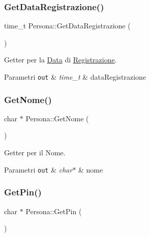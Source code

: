 \subsubsection{\texorpdfstring{Get\+Data\+Registrazione()}{GetDataRegistrazione()}}
{\footnotesize\ttfamily time\+\_\+t Persona\+::\+Get\+Data\+Registrazione (\begin{DoxyParamCaption}{ }\end{DoxyParamCaption})}



Getter per la \mbox{\hyperlink{class_data}{Data}} di \mbox{\hyperlink{class_registrazione}{Registrazione}}. 


\begin{DoxyParams}[1]{Parametri}
\mbox{\tt out}  & {\em time\+\_\+t} & data\+Registrazione \\
\hline
\end{DoxyParams}
\mbox{\label{class_persona_a05788dcb627fed81b04c90a6b82121aa}} 
\subsubsection{\texorpdfstring{Get\+Nome()}{GetNome()}}
{\footnotesize\ttfamily char $\ast$ Persona\+::\+Get\+Nome (\begin{DoxyParamCaption}{ }\end{DoxyParamCaption})}



Getter per il Nome. 


\begin{DoxyParams}[1]{Parametri}
\mbox{\tt out}  & {\em char$\ast$} & nome \\
\hline
\end{DoxyParams}
\mbox{\label{class_persona_a840ce621ec4598d7c2c52cbfdf39764b}} 
\subsubsection{\texorpdfstring{Get\+Pin()}{GetPin()}}
{\footnotesize\ttfamily char $\ast$ Persona\+::\+Get\+Pin (\begin{DoxyParamCaption}{ }\end{DoxyParamCaption})}



